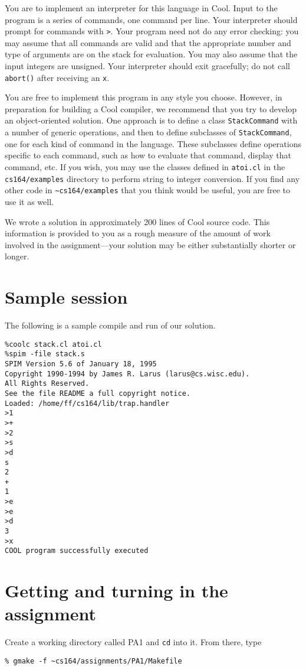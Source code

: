 \documentclass[11pt]{article}
\begin{document}
You are to implement an interpreter for this language in Cool.  Input to
the program is a series of commands, one command per line.  Your
interpreter should prompt for commands with {\tt >}.  Your program need
not do any error checking: you may assume that all commands are valid
and that the appropriate number and type of arguments are on the stack
for evaluation. You may also assume that the input integers are
unsigned.  Your interpreter should exit gracefully; do not call {\tt abort()}
after receiving an {\tt x}. %

You are free to implement this program in any style you choose.
However, in preparation for building a Cool compiler, we recommend that
you try to develop an object-oriented solution.  One approach is to
define a class {\tt StackCommand} with a number of generic operations, and then
to define subclasses of {\tt StackCommand}, one for each kind of command in the
language.  These subclasses define operations specific to each command,
such as how to evaluate that command, display that command, etc.  If you
wish, you may use the classes defined in {\tt atoi.cl} in the {\tt \~{
}cs164/examples} directory to perform string to integer conversion.
If you find any other code in {\tt \~{}cs164/examples} that you think
would be useful, you are free to use it as well.

We wrote a solution in approximately 200 lines of Cool source code.
This information is provided to you as a rough measure of the amount of
work involved in the assignment---your solution may be either
substantially shorter or longer.

\section*{Sample session} 
The following is a sample compile and run of our solution.
\begin{verbatim}
%coolc stack.cl atoi.cl
%spim -file stack.s
SPIM Version 5.6 of January 18, 1995
Copyright 1990-1994 by James R. Larus (larus@cs.wisc.edu).
All Rights Reserved.
See the file README a full copyright notice.
Loaded: /home/ff/cs164/lib/trap.handler
>1
>+
>2
>s
>d
s
2
+
1
>e
>e
>d
3
>x
COOL program successfully executed
\end{verbatim}

\section*{Getting and turning in the assignment} 
Create a working directory called PA1 and {\tt cd} into it.  From there, type
\begin{verbatim}
% gmake -f ~cs164/assignments/PA1/Makefile
\end{verbatim}
\end{document}
